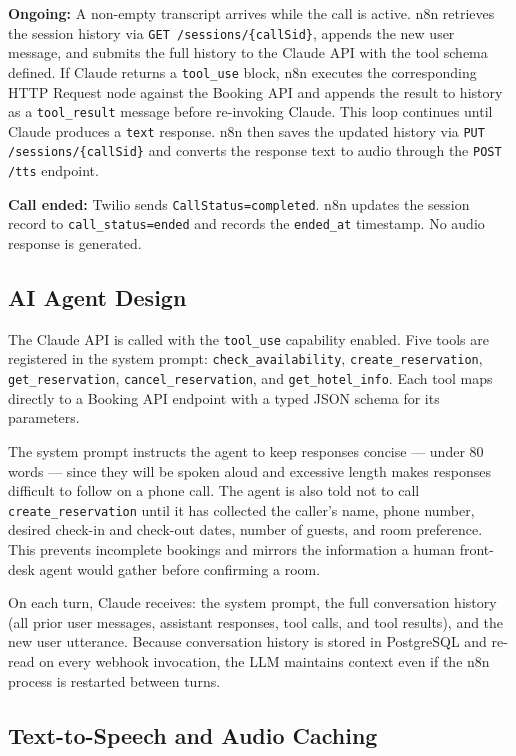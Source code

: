 \documentclass[conference]{IEEEtran}
\begin{document}
\textbf{Ongoing:} A non-empty transcript arrives while the call is active.
n8n retrieves the session history via \texttt{GET /sessions/\{callSid\}},
appends the new user message, and submits the full history to the Claude API
with the tool schema defined. If Claude returns a \texttt{tool\_use} block,
n8n executes the corresponding HTTP Request node against the Booking API and
appends the result to history as a \texttt{tool\_result} message before
re-invoking Claude. This loop continues until Claude produces a
\texttt{text} response. n8n then saves the updated history via
\texttt{PUT /sessions/\{callSid\}} and converts the response text to audio
through the \texttt{POST /tts} endpoint.

\textbf{Call ended:} Twilio sends \texttt{CallStatus=completed}. n8n updates
the session record to \texttt{call\_status=ended} and records the
\texttt{ended\_at} timestamp. No audio response is generated.

\subsection{AI Agent Design}

The Claude API is called with the \texttt{tool\_use} capability enabled. Five
tools are registered in the system prompt: \texttt{check\_availability},
\texttt{create\_reservation}, \texttt{get\_reservation},
\texttt{cancel\_reservation}, and \texttt{get\_hotel\_info}. Each tool maps
directly to a Booking API endpoint with a typed JSON schema for its parameters.

The system prompt instructs the agent to keep responses concise — under
80 words — since they will be spoken aloud and excessive length makes responses
difficult to follow on a phone call. The agent is also told not to call
\texttt{create\_reservation} until it has collected the caller's name, phone
number, desired check-in and check-out dates, number of guests, and room
preference. This prevents incomplete bookings and mirrors the information a
human front-desk agent would gather before confirming a room.

On each turn, Claude receives: the system prompt, the full conversation history
(all prior user messages, assistant responses, tool calls, and tool results),
and the new user utterance. Because conversation history is stored in
PostgreSQL and re-read on every webhook invocation, the LLM maintains
context even if the n8n process is restarted between turns.

\subsection{Text-to-Speech and Audio Caching}
\end{document}
